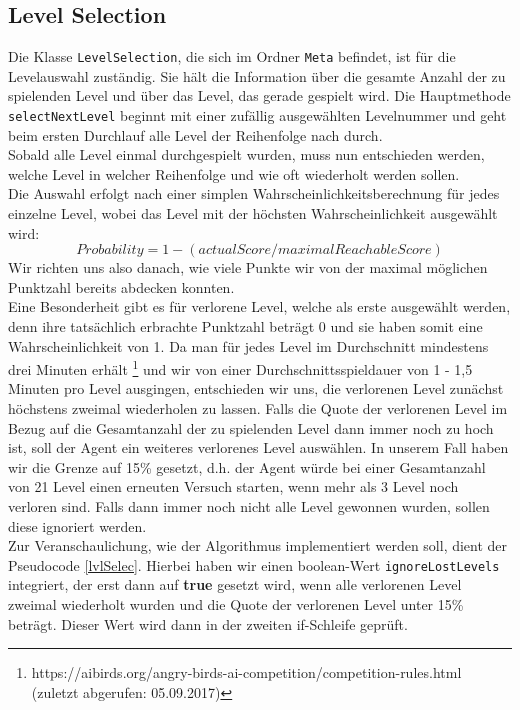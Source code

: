 \subsection{Level Selection}
Die Klasse \texttt{LevelSelection}, die sich im Ordner \texttt{Meta} befindet, ist für die Levelauswahl zuständig. Sie hält die Information über die gesamte Anzahl der zu spielenden Level und über das Level, das gerade gespielt wird. Die Hauptmethode \texttt{selectNextLevel} beginnt mit einer zufällig ausgewählten Levelnummer und geht beim ersten Durchlauf alle Level der Reihenfolge nach durch. \\
Sobald alle Level einmal durchgespielt wurden, muss nun entschieden werden, welche Level in welcher Reihenfolge und wie oft wiederholt werden sollen. \\
Die Auswahl erfolgt nach einer simplen Wahrscheinlichkeitsberechnung für jedes einzelne Level, wobei das Level mit der höchsten Wahrscheinlichkeit ausgewählt wird: \\
$$ Probability = 1 - ( actualScore / maximalReachableScore ) $$
Wir richten uns also danach, wie viele Punkte wir von der maximal möglichen Punktzahl bereits abdecken konnten. \\
Eine Besonderheit gibt es für verlorene Level, welche als erste ausgewählt werden, denn ihre tatsächlich erbrachte Punktzahl beträgt 0 und sie haben somit eine Wahrscheinlichkeit von 1. Da man für jedes Level im Durchschnitt mindestens drei Minuten erhält \footnote{https://aibirds.org/angry-birds-ai-competition/competition-rules.html (zuletzt abgerufen: 05.09.2017)} und wir von einer Durchschnittsspieldauer von 1 - 1,5 Minuten pro Level ausgingen, entschieden wir uns, die verlorenen Level zunächst höchstens zweimal wiederholen zu lassen. Falls die Quote der verlorenen Level im Bezug auf die Gesamtanzahl der zu spielenden Level dann immer noch zu hoch ist, soll der Agent ein weiteres verlorenes Level auswählen. In unserem Fall haben wir die Grenze auf 15\% gesetzt, d.h. der Agent würde bei einer Gesamtanzahl von 21 Level einen erneuten Versuch starten, wenn mehr als 3 Level noch verloren sind. Falls dann immer noch nicht alle Level gewonnen wurden, sollen diese ignoriert werden. \\ 
Zur Veranschaulichung, wie der Algorithmus implementiert werden soll, dient der Pseudocode \ref{lvlSelec}. Hierbei haben wir einen boolean-Wert \texttt{ignoreLostLevels} integriert, der erst dann auf \textbf{true} gesetzt wird, wenn alle verlorenen Level zweimal wiederholt wurden und die Quote der verlorenen Level unter 15\% beträgt. Dieser Wert wird dann in der zweiten if-Schleife geprüft. \\
